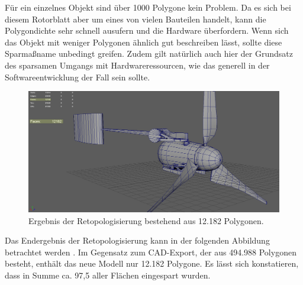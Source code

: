 Für ein einzelnes Objekt sind über 1000 Polygone kein Problem. Da es sich bei diesem Rotorblatt aber um eines von vielen Bauteilen handelt, kann die Polygondichte sehr schnell ausufern und die Hardware überfordern. Wenn sich das Objekt mit weniger Polygonen ähnlich gut beschreiben lässt, sollte diese Sparmaßname unbedingt greifen. Zudem gilt natürlich auch hier der Grundsatz des sparsamen Umgangs mit Hardwareressourcen, wie das generell in der Softwareentwicklung der Fall sein sollte.  

\begin{figure}[H]
	\centering
	\captionsetup{width=1\textwidth}
	\includegraphics[keepaspectratio, width=1\textwidth]{bildquellen/WEA-Vergleich2}
	\caption{Ergebnis der Retopologisierung bestehend aus 12.182 Polygonen.}
	\label{fig:2.7}
\end{figure}

Das Endergebnis der Retopologisierung kann in der folgenden Abbildung betrachtet werden  . Im Gegensatz zum CAD-Export, der aus 494.988 Polygonen besteht, enthält das neue Modell nur 12.182 Polygone. Es lässt sich konstatieren, dass in Summe ca. 97,5 aller Flächen eingespart wurden.
